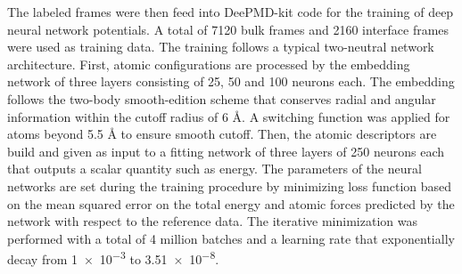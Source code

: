 The labeled frames were then feed into DeePMD-kit code \cite{wang2018deepmd,zeng2023deepmd,lu2021,zhang2018end} for the training of deep neural network potentials. A total of 7120 bulk frames and 2160 interface frames were used as training data. The training follows a typical two-neutral network architecture. First, atomic configurations are processed by the embedding network of three layers consisting of 25, 50 and 100 neurons each. The embedding follows the two-body smooth-edition scheme \cite{NEURIPS2018} that conserves radial and angular information within the cutoff radius of 6 \r{A}. A switching function was applied for atoms beyond 5.5 \r{A} to ensure smooth cutoff.  Then, the atomic descriptors are build and given as input to a fitting network of three layers of 250 neurons each that outputs a scalar quantity such as energy. The parameters of the neural networks are set during the training procedure by minimizing  loss function based on the mean squared error on the total energy and atomic forces predicted
by the network with respect to the reference data. The iterative minimization was performed with a total of 4 million batches and a learning rate that exponentially decay from \num{1e-3} to \num{3.51e-8}.

